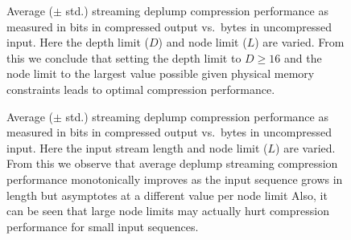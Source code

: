 
\begin{figure}[t] 
	\begin{center}
		\caption{Average ($\pm$ std.) streaming deplump compression performance as measured in bits in compressed output vs.~bytes in uncompressed input.  Here the depth limit ($D$) and node limit ($L$) are varied.  From this we conclude that setting the depth limit to $D\geq16$ and the node limit to the largest value possible given physical memory constraints leads to optimal compression performance.}
		\label{fig:varying_depths}
	\end{center} 
\end{figure} 


\begin{figure}[t] 
	\begin{center}
		\caption{Average ($\pm$ std.) streaming deplump compression performance as measured in bits in compressed output vs.~bytes in uncompressed input.  Here the input stream length and node limit ($L$) are varied.  From this we observe that average deplump streaming compression performance monotonically improves as the input sequence grows in length but asymptotes at a different value per node limit  Also, it can be seen that large node limits may actually hurt compression performance for small input sequences.}
		\label{fig:varying_stream_length}
	\end{center} 
\end{figure} 

